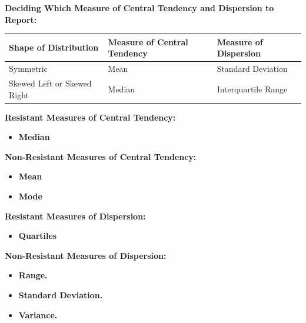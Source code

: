 \documentclass{report}
\begin{document}
       \pagebreak \bigbreak \noindent
       \textbf{Deciding Which Measure of Central Tendency and Dispersion to Report:}
       \bigbreak \noindent 
       \begin{center}
           \begin{tabular}{|l|l|l|}
            \hline
            Shape of Distribution & Measure of Central Tendency & Measure of Dispersion \\
            \hline
            Symmetric & Mean & Standard Deviation \\
            \hline
            Skewed Left or Skewed Right & Median & Interquartile Range \\
            \hline
            \end{tabular}
       \end{center}
       \bigbreak \noindent 

       \bigbreak \noindent 
       \textbf{Resistant Measures of Central Tendency:}
       \begin{itemize}
           \item \textbf{Median}
       \end{itemize}
      \textbf{Non-Resistant Measures of Central Tendency:}
      \begin{itemize}
          \item \textbf{Mean}
          \item \textbf{Mode}
      \end{itemize}
      \bigbreak \noindent 
      \textbf{Resistant Measures of Dispersion:}
      \begin{itemize}
          \item \textbf{Quartiles}
      \end{itemize}
      \bigbreak \noindent 
    \textbf{Non-Resistant Measures of Dispersion:}
    \begin{itemize}
        \item \textbf{Range.}
        \item \textbf{Standard Deviation.}
        \item \textbf{Variance.}
    \end{itemize}
\end{document}
